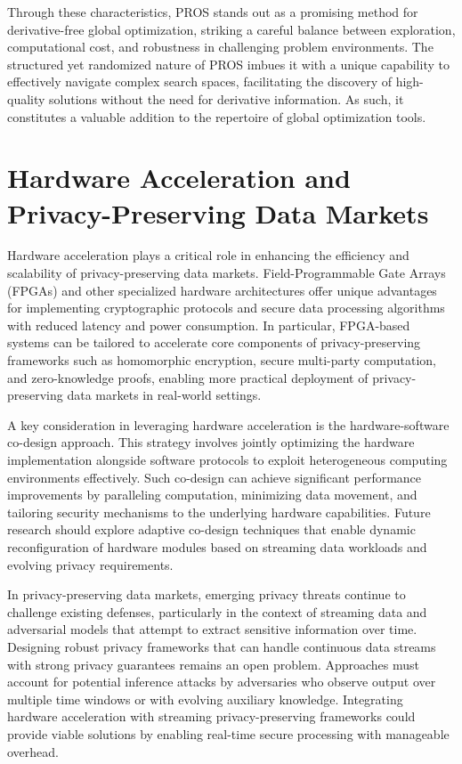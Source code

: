 \documentclass[sigconf]{acmart}
\begin{document}
Through these characteristics, PROS stands out as a promising method for derivative-free global optimization, striking a careful balance between exploration, computational cost, and robustness in challenging problem environments. The structured yet randomized nature of PROS imbues it with a unique capability to effectively navigate complex search spaces, facilitating the discovery of high-quality solutions without the need for derivative information. As such, it constitutes a valuable addition to the repertoire of global optimization tools.

\section{Hardware Acceleration and Privacy-Preserving Data Markets}

Hardware acceleration plays a critical role in enhancing the efficiency and scalability of privacy-preserving data markets. Field-Programmable Gate Arrays (FPGAs) and other specialized hardware architectures offer unique advantages for implementing cryptographic protocols and secure data processing algorithms with reduced latency and power consumption. In particular, FPGA-based systems can be tailored to accelerate core components of privacy-preserving frameworks such as homomorphic encryption, secure multi-party computation, and zero-knowledge proofs, enabling more practical deployment of privacy-preserving data markets in real-world settings. 

A key consideration in leveraging hardware acceleration is the hardware-software co-design approach. This strategy involves jointly optimizing the hardware implementation alongside software protocols to exploit heterogeneous computing environments effectively. Such co-design can achieve significant performance improvements by paralleling computation, minimizing data movement, and tailoring security mechanisms to the underlying hardware capabilities. Future research should explore adaptive co-design techniques that enable dynamic reconfiguration of hardware modules based on streaming data workloads and evolving privacy requirements.

In privacy-preserving data markets, emerging privacy threats continue to challenge existing defenses, particularly in the context of streaming data and adversarial models that attempt to extract sensitive information over time. Designing robust privacy frameworks that can handle continuous data streams with strong privacy guarantees remains an open problem. Approaches must account for potential inference attacks by adversaries who observe output over multiple time windows or with evolving auxiliary knowledge. Integrating hardware acceleration with streaming privacy-preserving frameworks could provide viable solutions by enabling real-time secure processing with manageable overhead.
\end{document}
